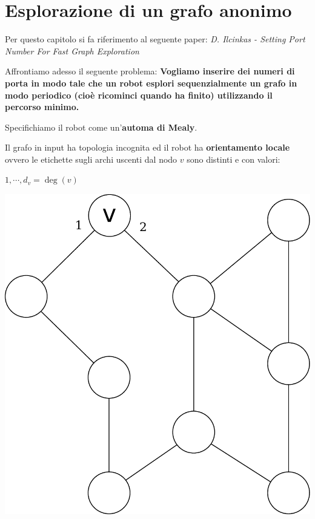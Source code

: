 \chapter{Esplorazione di un grafo anonimo}

Per questo capitolo si fa riferimento al seguente paper: \emph{D. Ilcinkas -
    Setting Port Number For Fast Graph Exploration}

Affrontiamo adesso il seguente problema: \textbf{Vogliamo inserire dei numeri di
    porta in modo tale che un robot esplori sequenzialmente un grafo in modo
    periodico (cioè ricominci quando ha finito) utilizzando il percorso minimo.}


Specifichiamo il robot come un'\textbf{automa di Mealy}.

Il grafo in input ha topologia incognita ed il robot ha \textbf{orientamento
    locale} ovvero le etichette sugli archi uscenti dal nodo $v$ sono distinti e con
valori:
\begin{center}
    $1, \cdots, d_v = \deg (v)$\end{center}
\begin{center}
    \includegraphics[scale=0.3]{images/n_25}
\end{center}

